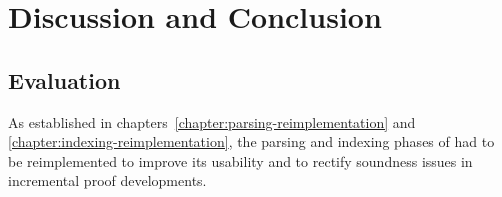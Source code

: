 \chapter{Discussion and Conclusion}


\section{Evaluation}

As established in chapters~\ref{chapter:parsing-reimplementation} and \ref{chapter:indexing-reimplementation}, the parsing and indexing phases of \Beluga had to be reimplemented to improve its usability and to rectify soundness issues in incremental proof developments.








